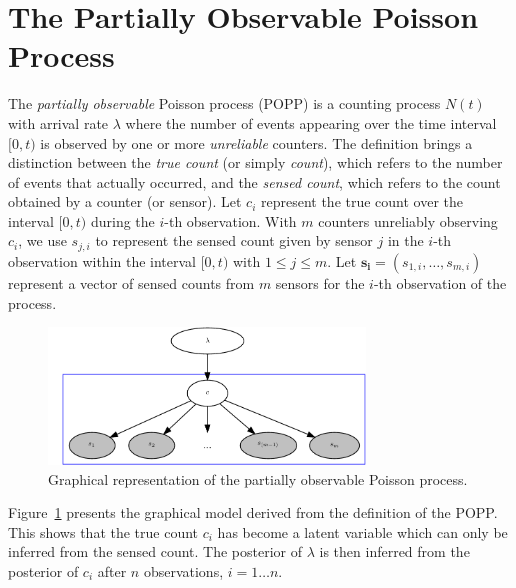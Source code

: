 
\section{The Partially Observable Poisson Process}
\label{sec:popp}

The \emph{partially observable} Poisson process (POPP) is a counting process $N(t)$ with arrival rate $\lambda$ where the number of events appearing over the time interval $[0, t)$ is observed by one or more \emph{unreliable} counters. 
% 
The definition brings a distinction between the \emph{true count} (or simply \emph{count}), which refers to the number of events that actually occurred, and the \emph{sensed count}, which refers to the count obtained by a counter (or sensor). Let $c_i$ represent the true count over the interval $[0, t)$ during the $i$-th observation. With $m$ counters unreliably observing $c_i$, we use  $s_{j,i}$ to represent the sensed count given by sensor $j$ in the $i$-th observation within the interval $[0, t)$ with $1 \leq j \leq m$. Let $\mathbf{s_i} = (s_{1,i}, \ldots, s_{m,i})$ represent a vector of sensed counts from $m$ sensors for the $i$-th observation of the process. 

\begin{figure}[t!]
	\centering
	\includegraphics[width=0.75\textwidth]{./figures/popp-pics.pdf}
	\caption{Graphical representation of the partially observable Poisson process.}
	\label{fig:gm_popp}
	\vspace{-10pt}
\end{figure}

Figure~\ref{fig:gm_popp} presents the graphical model derived from the definition of the POPP. This shows that the true count $c_i$ has become a latent variable which can only be inferred from the sensed count.
% 
The posterior of $\lambda$ is then inferred from the posterior of $c_i$ after $n$ observations, $i = 1 \ldots n$. 

